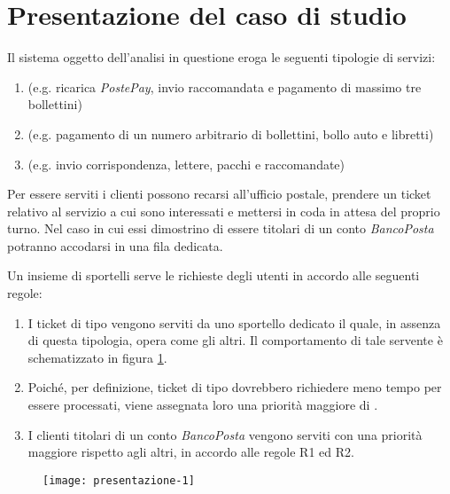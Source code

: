\section{Presentazione del caso di studio}\label{sec:presentazione}
Il sistema oggetto dell'analisi in questione eroga le seguenti tipologie di servizi:
\begin{enumerate}
\item \uo{} (e.g. ricarica \textsl{PostePay}, invio raccomandata e pagamento di massimo tre bollettini)
\item \pp{} (e.g. pagamento di un numero arbitrario di bollettini, bollo auto e libretti)  
\item \sr{} (e.g. invio corrispondenza, lettere, pacchi e raccomandate)
\end{enumerate}

Per essere serviti i clienti possono recarsi all'ufficio postale, prendere un ticket relativo al servizio a cui sono interessati e mettersi in coda in attesa del proprio turno. Nel caso in cui essi dimostrino di essere titolari di un conto \textsl{BancoPosta} potranno accodarsi in una fila dedicata.

Un insieme di sportelli serve le richieste degli utenti in accordo alle seguenti regole: 
\begin{enumerate}[label=R\arabic*), align=left, leftmargin=*]
\item I ticket di tipo \sr{} vengono serviti da uno sportello dedicato il quale, in assenza di questa tipologia, opera come gli altri. Il comportamento di tale servente è schematizzato in figura \ref{fig:presentazione-1}. 
\item Poiché, per definizione, ticket di tipo \uo{} dovrebbero richiedere meno tempo per essere processati, viene assegnata loro una priorità maggiore di \pp{}.
\item I clienti titolari di un conto \textsl{BancoPosta} vengono serviti con una priorità maggiore rispetto agli altri, in accordo alle regole R1 ed R2.
\end{enumerate}

\begin{figure}[ht]
\centering
\texttt{[image: presentazione-1]}
\label{fig:presentazione-1}
\end{figure}
